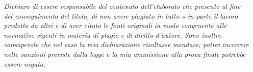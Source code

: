 \thispagestyle{plain}
\vspace*{\fill}
\noindent\textit{Dichiaro di essere responsabile del contenuto dell’elaborato che presento al fine del conseguimento del titolo, di non avere plagiato in tutto o in parte il lavoro prodotto da altri e di aver citato le fonti originali in modo congruente alle normative vigenti in materia di plagio e di diritto d’autore. Sono inoltre consapevole che nel caso la mia dichiarazione risultasse mendace, potrei incorrere nelle sanzioni previste dalla legge e la mia ammissione alla prova finale potrebbe essere negata.}
\vspace*{\fill}